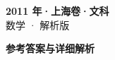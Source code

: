 \documentclass[zihao=-4, a4paper]{ctexart}
\begin{document}
\begin{center}
  {\Large\bfseries 2011 年·上海卷·文科}\\[4pt]
  {\large 数学 · 解析版}
\end{center}
\medskip
{}

\clearpage
{}
\begin{center}{\Large\bfseries 参考答案与详细解析}\end{center}
\medskip

\end{document}

